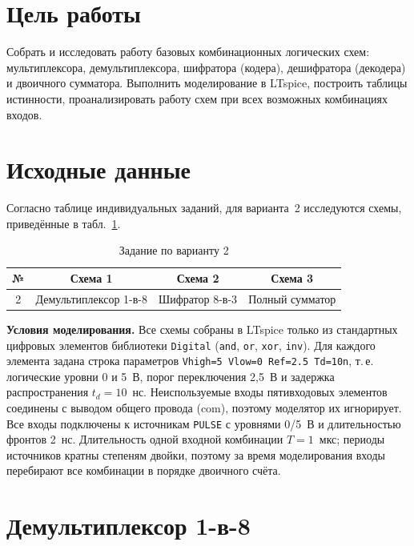 \documentclass[14pt]{extarticle}
\begin{document}

\tableofcontents
\newpage

\section*{Цель работы}
Собрать и исследовать работу базовых комбинационных логических схем: мультиплексора,
демультиплексора, шифратора (кодера), дешифратора (декодера) и двоичного сумматора.
Выполнить моделирование в LTspice, построить таблицы истинности, проанализировать работу
схем при всех возможных комбинациях входов.

\section*{Исходные данные}
Согласно таблице индивидуальных заданий, для варианта~2 исследуются схемы, приведённые в
табл.~\ref{tab:var}.

\begin{table}[H]
\caption{Задание по варианту 2}\label{tab:var}
\centering
\begin{tabular}{cccc}
\toprule
№ & Схема 1 & Схема 2 & Схема 3\\
\midrule
2 & Демультиплексор 1-в-8 & Шифратор 8-в-3 & Полный сумматор\\
\bottomrule
\end{tabular}
\end{table}

\textbf{Условия моделирования.} Все схемы собраны в LTspice только из стандартных
цифровых элементов библиотеки \texttt{Digital} (\texttt{and}, \texttt{or}, \texttt{xor},
\texttt{inv}). Для каждого элемента задана строка параметров
\texttt{Vhigh=5 Vlow=0 Ref=2.5 Td=10n}, т.\,е. логические уровни 0 и 5~В, порог
переключения 2,5~В и задержка распространения $t_d=10$~нс. Неиспользуемые входы
пятивходовых элементов соединены с выводом общего провода (com), поэтому моделятор их
игнорирует. Все входы подключены к источникам \texttt{PULSE} с уровнями 0/5~В и
длительностью фронтов 2~нс. Длительность одной входной комбинации $T=1$~мкс; периоды
источников кратны степеням двойки, поэтому за время моделирования входы перебирают все
комбинации в порядке двоичного счёта.

\section{Демультиплексор 1-в-8}
\end{document}
